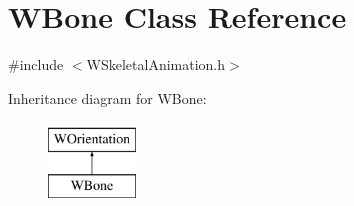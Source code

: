 \hypertarget{class_w_bone}{}\section{W\+Bone Class Reference}
\label{class_w_bone}


{\ttfamily \#include $<$W\+Skeletal\+Animation.\+h$>$}

Inheritance diagram for W\+Bone\+:\begin{figure}[H]
\begin{center}
\leavevmode
\includegraphics[height=2.000000cm]{class_w_bone}
\end{center}
\end{figure}
